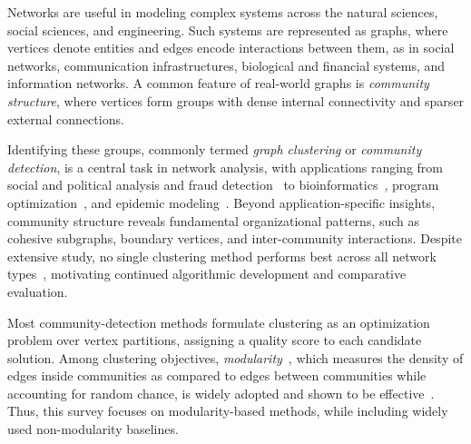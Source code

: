 \documentclass[../paper.tex]{subfiles}
\begin{document}
Networks are useful in modeling complex systems across the natural sciences, social sciences, and engineering. Such systems are represented as graphs, where vertices denote entities and edges encode interactions between them, as in social networks, communication infrastructures, biological and financial systems, and information networks. A common feature of real-world graphs is \emph{community structure}, where vertices form groups with dense internal connectivity and sparser external connections.

Identifying these groups, commonly termed \emph{graph clustering} or \emph{community detection}, is a central task in network analysis, with applications ranging from social and political analysis and fraud detection~\cite{Akoglu2015} to bioinformatics~\cite{Cai2011,Xu2002}, program optimization~\cite{Demme2012,McFarling89}, and epidemic modeling~\cite{Newman2003}. Beyond application-specific insights, community structure reveals fundamental organizational patterns, such as cohesive subgraphs, boundary vertices, and inter-community interactions. Despite extensive study, no single clustering method performs best across all network types~\cite{Peel2016}, motivating continued algorithmic development and comparative evaluation.

Most community-detection methods formulate clustering as an optimization problem over vertex partitions, assigning a quality score to each candidate solution. 
Among clustering objectives, \emph{modularity}~\cite{girvan2002,Newman2006}, which measures the density of edges inside communities as compared to edges between communities while accounting for random chance, is widely adopted and shown to be effective~\cite{dimacschallengegraphpartandcluster,licommunitydetectionsurvey24}. Thus, this survey focuses on modularity-based methods, while including widely used non-modularity baselines. 

\end{document}
